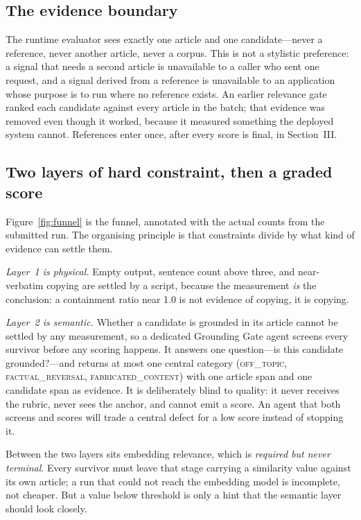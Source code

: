 \documentclass[conference]{IEEEtran}
\begin{document}
\subsection{The evidence boundary}
The runtime evaluator sees exactly one article and one candidate---never
a reference, never another article, never a corpus. This is not a
stylistic preference: a signal that needs a second article is
unavailable to a caller who sent one request, and a signal derived from
a reference is unavailable to an application whose purpose is to run
where no reference exists. An earlier relevance gate ranked each
candidate against every article in the batch; that evidence was removed
even though it worked, because it measured something the deployed system
cannot. References enter once, after every score is final, in
Section~III.

\subsection{Two layers of hard constraint, then a graded score}
Figure~\ref{fig:funnel} is the funnel, annotated with the actual counts
from the submitted run. The organising principle is that constraints
divide by what kind of evidence can settle them.

\emph{Layer~1 is physical.} Empty output, sentence count above three,
and near-verbatim copying are settled by a script, because the
measurement \emph{is} the conclusion: a containment ratio near 1.0 is
not evidence of copying, it is copying.

\emph{Layer~2 is semantic.} Whether a candidate is grounded in its
article cannot be settled by any measurement, so a dedicated Grounding
Gate agent screens every survivor before any scoring happens. It answers
one question---is this candidate grounded?---and returns at most one
central category (\textsc{off\_topic}, \textsc{factual\_reversal},
\textsc{fabricated\_content}) with one article span and one candidate
span as evidence. It is deliberately blind to quality: it never receives
the rubric, never sees the anchor, and cannot emit a score. An agent
that both screens and scores will trade a central defect for a low
score instead of stopping it.

Between the two layers sits embedding relevance, which is
\emph{required but never terminal}. Every survivor must leave that stage
carrying a similarity value against its own article; a run that could
not reach the embedding model is incomplete, not cheaper. But a value
below threshold is only a hint that the semantic layer should look
closely.
\end{document}
